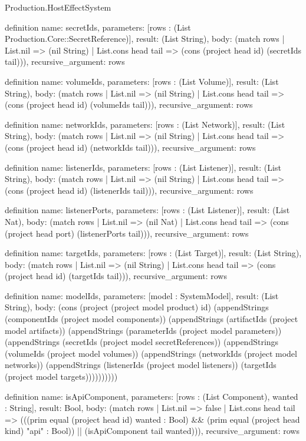 \begin{lexlean}{Production.HostEffectSystem}
\begin{semanticmodule}
definition{
  name: secretIds,
  parameters: [rows : (List Production.Core::SecretReference)],
  result: (List String),
  body: (match rows
    | List.nil => (nil String)
    | List.cons head tail => (cons (project head id) (secretIds tail))),
  recursive_argument: rows
}

definition{
  name: volumeIds,
  parameters: [rows : (List Volume)],
  result: (List String),
  body: (match rows
    | List.nil => (nil String)
    | List.cons head tail => (cons (project head id) (volumeIds tail))),
  recursive_argument: rows
}

definition{
  name: networkIds,
  parameters: [rows : (List Network)],
  result: (List String),
  body: (match rows
    | List.nil => (nil String)
    | List.cons head tail => (cons (project head id) (networkIds tail))),
  recursive_argument: rows
}

definition{
  name: listenerIds,
  parameters: [rows : (List Listener)],
  result: (List String),
  body: (match rows
    | List.nil => (nil String)
    | List.cons head tail => (cons (project head id) (listenerIds tail))),
  recursive_argument: rows
}

definition{
  name: listenerPorts,
  parameters: [rows : (List Listener)],
  result: (List Nat),
  body: (match rows
    | List.nil => (nil Nat)
    | List.cons head tail => (cons (project head port) (listenerPorts tail))),
  recursive_argument: rows
}

definition{
  name: targetIds,
  parameters: [rows : (List Target)],
  result: (List String),
  body: (match rows
    | List.nil => (nil String)
    | List.cons head tail => (cons (project head id) (targetIds tail))),
  recursive_argument: rows
}

definition{
  name: modelIds,
  parameters: [model : SystemModel],
  result: (List String),
  body: (cons (project (project model product) id) (appendStrings (componentIds (project model components)) (appendStrings (artifactIds (project model artifacts)) (appendStrings (parameterIds (project model parameters)) (appendStrings (secretIds (project model secretReferences)) (appendStrings (volumeIds (project model volumes)) (appendStrings (networkIds (project model networks)) (appendStrings (listenerIds (project model listeners)) (targetIds (project model targets))))))))))
}

definition{
  name: isApiComponent,
  parameters: [rows : (List Component), wanted : String],
  result: Bool,
  body: (match rows
    | List.nil => false
    | List.cons head tail => (((prim equal (project head id) wanted : Bool) && (prim equal (project head kind) "api" : Bool)) || (isApiComponent tail wanted))),
  recursive_argument: rows
}


\end{semanticmodule}
\end{lexlean}
